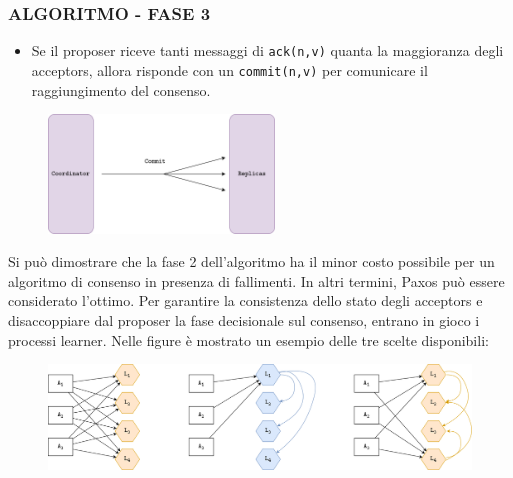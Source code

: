 \subsubsection{ALGORITMO - FASE 3}
\begin{itemize}
    \item Se il proposer riceve tanti messaggi di \texttt{ack(n,v)} quanta la maggioranza degli acceptors, allora risponde con un \texttt{commit(n,v)} per comunicare il raggiungimento del consenso.
\end{itemize}

\begin{figure}[ht]
    \centering
    \includegraphics[width=6cm]{./Images/cap2/2.16.png}
\end{figure}
\vspace{5mm}
Si può dimostrare che la fase 2 dell'algoritmo ha il minor costo possibile per un algoritmo di consenso in presenza di fallimenti. In altri termini, Paxos può essere considerato l'ottimo. Per garantire la consistenza dello stato degli acceptors e disaccoppiare dal proposer la fase decisionale sul consenso, entrano in gioco i processi learner. Nelle figure è mostrato un esempio delle tre scelte disponibili:
\begin{figure}[ht]
    \centering
    \includegraphics[width=12cm]{./Images/cap2/2.17.png}
\end{figure}

